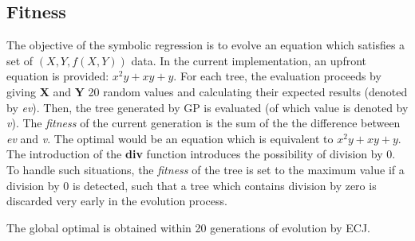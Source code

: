 \subsection{Fitness}
The objective of the symbolic regression is to evolve an equation which satisfies a set of $(X, Y, f(X, Y))$ data. In the current implementation, an upfront equation is provided: $x^2y + xy + y$. For each tree, the evaluation proceeds by giving \textbf{X} and \textbf{Y} 20 random values and calculating their expected results (denoted by \emph{ev}). Then, the tree generated by GP is evaluated (of which value is denoted by \emph{v}). The \emph{fitness} of the current generation is the sum of the the difference between \emph{ev} and \emph{v}. The optimal would be an equation which is equivalent to $x^2y + xy + y$. The introduction of the \textbf{div} function introduces the possibility of division by 0. To handle such situations, the \emph{fitness} of the tree is set to the maximum value if a division by 0 is detected, such that a tree which contains division by zero is discarded very early in the evolution process. 

The global optimal is obtained within 20 generations of evolution by ECJ. 